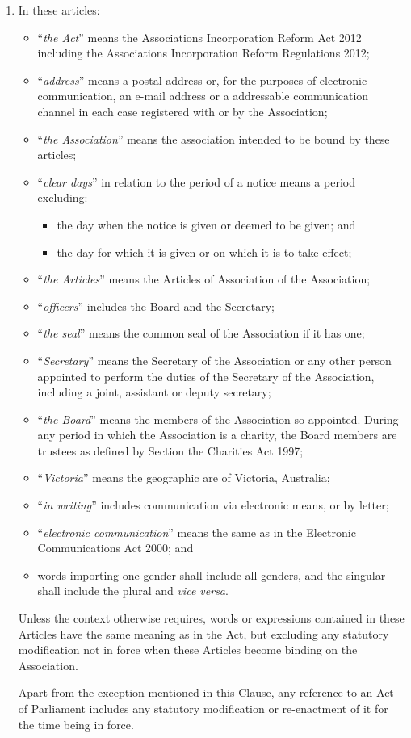 \documentclass[english,a4paper,titlepage,oneside]{article}
\begin{document}
\begin{enumerate}
\item In these articles:

\begin{itemize}
\item {}``\emph{the Act}'' means the Associations Incorporation Reform Act 
2012 including the Associations Incorporation Reform Regulations 2012;
\item {}``\emph{address}'' means a postal address or, for the purposes
of electronic communication, an e-mail address or a addressable 
communication channel in each case registered with or by the Association;
\item {}``\emph{the Association}'' means the association intended to be bound by these articles;
\item {}``\emph{clear days}'' in relation to the period of a notice means
a period excluding:

\begin{itemize}
\item the day when the notice is given or deemed to be given; and
\item the day for which it is given or on which it is to take effect;
\end{itemize}
\item {}``\emph{the Articles}'' means the Articles of Association
of the Association;
\item {}``\emph{officers}'' includes the Board and the Secretary;
\item {}``\emph{the seal}'' means the common seal of the Association if it
has one;
\item {}``\emph{Secretary}'' means the Secretary of the Association or any
other person appointed to perform the duties of the Secretary of the
Association, including a joint, assistant or deputy secretary;
\item {}``\emph{the Board}'' means the members of the Association so appointed. During any period in which the Association is a charity, the Board members are trustees as defined by Section the Charities Act 1997;
\item {}``\emph{Victoria}'' means the geographic are of Victoria, Australia;
\item {}``\emph{in writing}'' includes communication via electronic means,
or by letter;
\item {}``\emph{electronic communication}'' means the same as in the Electronic Communications Act 2000; and
\item words importing one gender shall include all genders, and the singular
shall include the plural and \emph{vice versa}.
\end{itemize}

Unless the context otherwise requires, words or expressions contained
in these Articles have the same meaning as in the Act, but excluding
any statutory modification not in force when these Articles become
binding on the Association.

Apart from the exception mentioned in this Clause, any reference to an Act of Parliament includes any statutory modification or re-enactment of it for the time being in force.

\end{enumerate}
\end{document}
